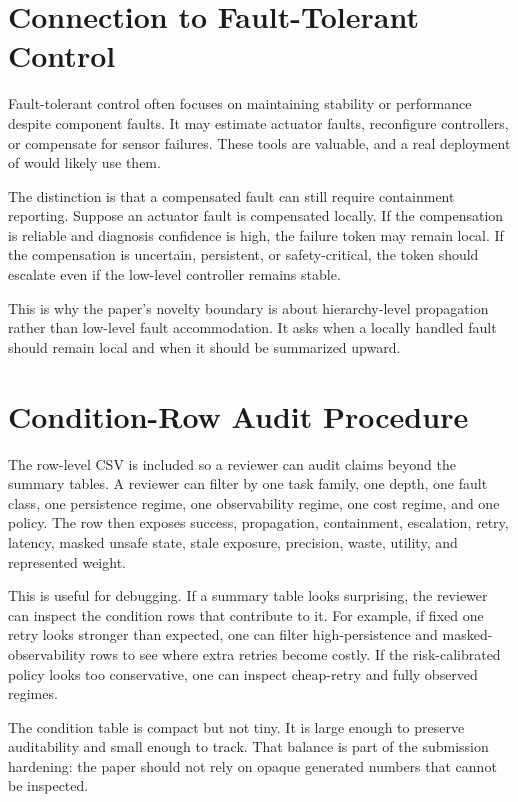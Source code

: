 \section{Connection to Fault-Tolerant Control}

Fault-tolerant control often focuses on maintaining stability or performance despite component faults. It may estimate actuator faults, reconfigure controllers, or compensate for sensor failures. These tools are valuable, and a real deployment of \method would likely use them.

The distinction is that a compensated fault can still require containment reporting. Suppose an actuator fault is compensated locally. If the compensation is reliable and diagnosis confidence is high, the failure token may remain local. If the compensation is uncertain, persistent, or safety-critical, the token should escalate even if the low-level controller remains stable.

This is why the paper's novelty boundary is about hierarchy-level propagation rather than low-level fault accommodation. It asks when a locally handled fault should remain local and when it should be summarized upward.

\section{Condition-Row Audit Procedure}

The row-level CSV is included so a reviewer can audit claims beyond the summary tables. A reviewer can filter by one task family, one depth, one fault class, one persistence regime, one observability regime, one cost regime, and one policy. The row then exposes success, propagation, containment, escalation, retry, latency, masked unsafe state, stale exposure, precision, waste, utility, and represented weight.

This is useful for debugging. If a summary table looks surprising, the reviewer can inspect the condition rows that contribute to it. For example, if fixed one retry looks stronger than expected, one can filter high-persistence and masked-observability rows to see where extra retries become costly. If the risk-calibrated policy looks too conservative, one can inspect cheap-retry and fully observed regimes.

The condition table is compact but not tiny. It is large enough to preserve auditability and small enough to track. That balance is part of the submission hardening: the paper should not rely on opaque generated numbers that cannot be inspected.

